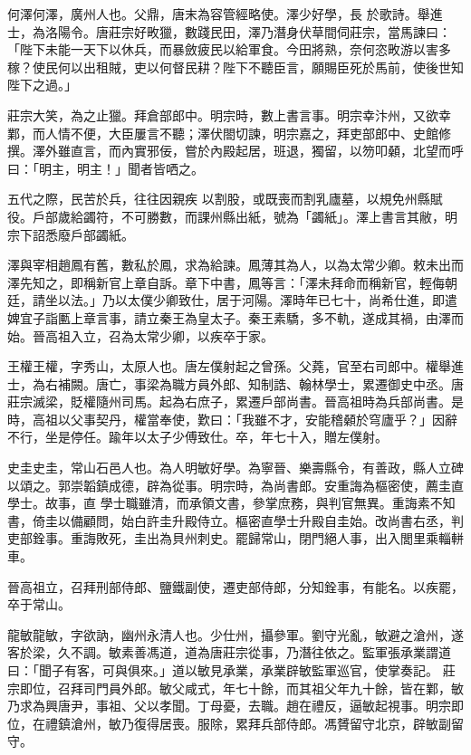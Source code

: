 \begin{pinyinscope}
 何澤何澤，廣州人也。父鼎，唐末為容管經略使。澤少好學，長
 於歌詩。舉進士，為洛陽令。唐莊宗好畋獵，數踐民田，澤乃潛身伏草間伺莊宗，當馬諫曰：「陛下未能一天下以休兵，而暴斂疲民以給軍食。今田將熟，奈何恣畋游以害多稼？使民何以出租賊，吏以何督民耕？陛下不聽臣言，願賜臣死於馬前，使後世知陛下之過。」



 莊宗大笑，為之止獵。拜倉部郎中。明宗時，數上書言事。明宗幸汴州，又欲幸鄴，而人情不便，大臣屢言不聽；澤伏閤切諫，明宗嘉之，拜吏部郎中、史館修撰。澤外雖直言，而內實邪佞，嘗於內殿起居，班退，獨留，以笏叩顙，北望而呼曰：「明主，明主！」聞者皆哂之。



 五代之際，民苦於兵，往往因親疾
 以割股，或既喪而割乳廬墓，以規免州縣賦役。戶部歲給蠲符，不可勝數，而課州縣出紙，號為「蠲紙」。澤上書言其敝，明宗下詔悉廢戶部蠲紙。



 澤與宰相趙鳳有舊，數私於鳳，求為給諫。鳳薄其為人，以為太常少卿。敕未出而澤先知之，即稱新官上章自訴。章下中書，鳳等言：「澤未拜命而稱新官，輕侮朝廷，請坐以法。」乃以太僕少卿致仕，居于河陽。澤時年已七十，尚希仕進，即遣婢宜子詣匭上章言事，請立秦王為皇太子。秦王素驕，多不軌，遂成其禍，由澤而始。晉高祖入立，召為太常少卿，以疾卒于家。



 王權王權，字秀山，太原人也。唐左僕射起之曾孫。父蕘，官至右司郎中。權舉進士，為右補闕。唐亡，事梁為職方員外郎、知制誥、翰林學士，累遷御史中丞。唐莊宗滅梁，貶權隨州司馬。起為右庶子，累遷戶部尚書。晉高祖時為兵部尚書。是時，高祖以父事契丹，權當奉使，歎曰：「我雖不才，安能稽顙於穹廬乎？」因辭不行，坐是停任。踰年以太子少傅致仕。卒，年七十入，贈左僕射。



 史圭史圭，常山石邑人也。為人明敏好學。為寧晉、樂壽縣令，有善政，縣人立碑以頌之。郭崇韜鎮成德，辟為從事。明宗時，為尚書郎。安重誨為樞密使，薦圭直學士。故事，直
 學士職雖清，而承領文書，參掌庶務，與判官無異。重誨素不知書，倚圭以備顧問，始白許圭升殿侍立。樞密直學士升殿自圭始。改尚書右丞，判吏部銓事。重誨敗死，圭出為貝州刺史。罷歸常山，閉門絕人事，出入閭里乘輜軿車。



 晉高祖立，召拜刑部侍郎、鹽鐵副使，遷吏部侍郎，分知銓事，有能名。以疾罷，卒于常山。



 龍敏龍敏，字欲訥，幽州永清人也。少仕州，攝參軍。劉守光亂，敏避之滄州，遂客於梁，久不調。敏素善馮道，道為唐莊宗從事，乃潛往依之。監軍張承業謂道曰：「聞子有客，可與俱來。」道以敏見承業，承業辟敏監軍巡官，使掌奏記。
 莊宗即位，召拜司門員外郎。敏父咸式，年七十餘，而其祖父年九十餘，皆在鄴，敏乃求為興唐尹，事祖、父以孝聞。丁母憂，去職。趙在禮反，逼敏起視事。明宗即位，在禮鎮滄州，敏乃復得居喪。服除，累拜兵部侍郎。馮贇留守北京，辟敏副留守。




\end{pinyinscope}
